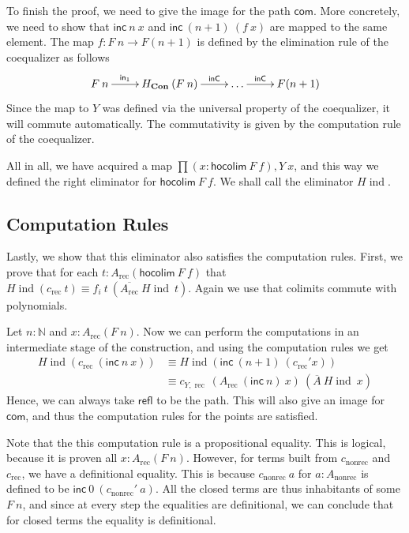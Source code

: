 \documentclass[a4paper,UKenglish]{lipics-v2016}
\newcommand{\Boperator}[1]{\mathsf{#1}}
\newcommand{\inn}{\Boperator{in}}
\newcommand{\ind}[0]{\!\operatorname{ind}}
\newcommand{\rec}[0]{\operatorname{rec}}
\newcommand{\nonrec}[0]{\operatorname{nonrec}}
\newcommand{\Con}[0]{\textbf{Con}}
\newcommand{\refl}[0]{\Boperator{refl}}
\newcommand{\inC}[0]{\Boperator{inC}}
\newcommand{\hocolim}[0]{\Boperator{hocolim}}
\newcommand{\inc}[0]{\Boperator{inc}}
\newcommand{\com}[0]{\Boperator{com}}
\begin{document}
To finish the proof, we need to give the image for the path $\com$.
More concretely, we need to show that $\inc \> n \> x$ and $\inc \> (n+1) \> (f \> x)$ are mapped to the same element.
The map $f : F \> n \rightarrow F(n + 1)$ is defined by the elimination rule of the coequalizer as follows
\[
\xymatrix
{
        F \> n \ar[r]^-{\inn_1} & H_{\Con} \> (F \> n) \ar[r]^-{\inC} & \ldots \ar[r]^-{\inC} & F(n+1)
}
\]
Since the map to $Y$ was defined via the universal property of the coequalizer, it will commute automatically.
The commutativity is given by the computation rule of the coequalizer.

All in all, we have acquired a map $\prod (x : \hocolim \> F \> f), Y \> x$, and this way we defined the right eliminator for $\hocolim \> F \> f$.
We shall call the eliminator $H\ind$.

\subsection{Computation Rules}
Lastly, we show that this eliminator also satisfies the computation rules.
First, we prove that for each $t : A_{\rec}(\hocolim \> F \> f)$ that $H\ind(c_{\rec} \> t) \equiv f_i \> t \> (\overline{A_{\rec}} \> H\ind \> t)$.
Again we use that colimits commute with polynomials.

Let $n : \mathbb{N}$ and $x : A_{\rec}(F \> n)$.
Now we can perform the computations in an intermediate stage of the construction, and using the computation rules we get
\begin{equation*}
\begin{split}
H\ind(c_{\rec} \> (\inc \> n \> x)) 
&\equiv H\ind(\inc \> (n+1) \> (c_{\rec}' x)) \\
&\equiv c_{Y,\rec} \> (A_{\rec} \> (\inc \> n) \> x) \> (\overline{A} \> H\ind \> x)
\end{split}
\end{equation*}
Hence, we can always take $\refl$ to be the path.
This will also give an image for $\com$, and thus the computation rules for the points are satisfied.

Note that the this computation rule is a propositional equality.
This is logical, because it is proven all $x : A_{\rec}(F \> n)$.
However, for terms built from $c_{\nonrec}$ and $c_{\rec}$, we have a definitional equality.
This is because $c_{\nonrec} \> a$ for $a : A_{\nonrec}$ is defined to be $\inc \> 0 \> (c_{\nonrec}' \> a)$.
All the closed terms are thus inhabitants of some $F \> n$, and since at every step the equalities are definitional, we can conclude that for closed terms the equality is definitional.
\end{document}
